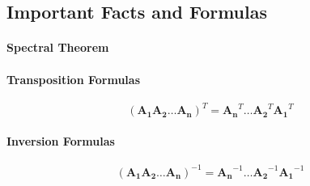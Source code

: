 

\subsection{Important Facts and Formulas}

\paragraph{Spectral Theorem}

\paragraph{Transposition Formulas}
\begin{equation}
(\mathbf{A_1 A_2 \ldots  A_n})^T = \mathbf{A_n}^T \ldots \mathbf{A_2}^T \mathbf{A_1}^T
\end{equation}


\paragraph{Inversion Formulas}
\begin{equation}
(\mathbf{A_1 A_2 \ldots  A_n})^{-1} = \mathbf{A_n}^{-1} \ldots \mathbf{A_2}^{-1} \mathbf{A_1}^{-1}
\end{equation}


